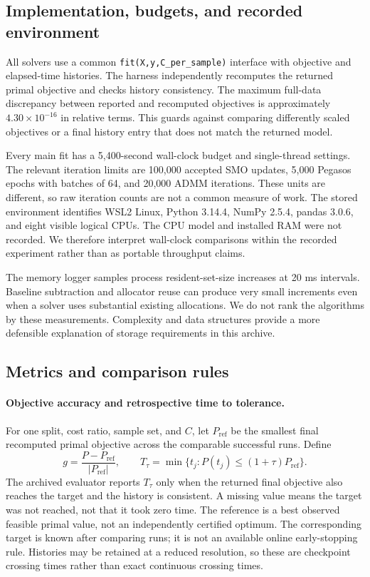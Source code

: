 \documentclass{article}
\newcommand{\pref}{P_{\mathrm{ref}}}
\begin{document}
\subsection{Implementation, budgets, and recorded environment}

All solvers use a common \texttt{fit(X,y,C\_per\_sample)} interface with objective and elapsed-time histories. The harness independently recomputes the returned primal objective and checks history consistency. The maximum full-data discrepancy between reported and recomputed objectives is approximately $4.30\times10^{-16}$ in relative terms. This guards against comparing differently scaled objectives or a final history entry that does not match the returned model.

Every main fit has a 5,400-second wall-clock budget and single-thread settings. The relevant iteration limits are 100,000 accepted SMO updates, 5,000 Pegasos epochs with batches of 64, and 20,000 ADMM iterations. These units are different, so raw iteration counts are not a common measure of work. The stored environment identifies WSL2 Linux, Python 3.14.4, NumPy 2.5.4, pandas 3.0.6, and eight visible logical CPUs. The CPU model and installed RAM were not recorded. We therefore interpret wall-clock comparisons within the recorded experiment rather than as portable throughput claims.

The memory logger samples process resident-set-size increases at 20 ms intervals. Baseline subtraction and allocator reuse can produce very small increments even when a solver uses substantial existing allocations. We do not rank the algorithms by these measurements. Complexity and data structures provide a more defensible explanation of storage requirements in this archive.

\subsection{Metrics and comparison rules}

\paragraph{Objective accuracy and retrospective time to tolerance.}
For one split, cost ratio, sample set, and $C$, let $\pref$ be the smallest final recomputed primal objective across the comparable successful runs. Define
\begin{equation}
 g=\frac{P-\pref}{|\pref|},\qquad
 T_\tau=\min\{t_j:P(t_j)\leq(1+\tau)\pref\}.
 \label{eq:empiricalgap}
\end{equation}
The archived evaluator reports $T_\tau$ only when the returned final objective also reaches the target and the history is consistent. A missing value means the target was not reached, not that it took zero time. The reference is a best observed feasible primal value, not an independently certified optimum. The corresponding target is known after comparing runs; it is not an available online early-stopping rule. Histories may be retained at a reduced resolution, so these are checkpoint crossing times rather than exact continuous crossing times.
\end{document}

